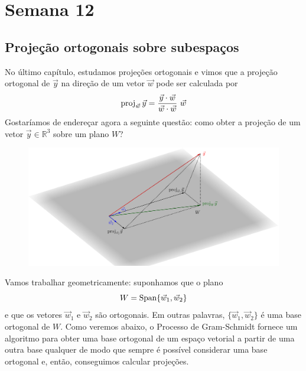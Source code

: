 

\providecommand{\dir}{..}


%

	\chapter{Semana 12}

\section{Projeção ortogonais sobre subespaços}

No último capítulo, estudamos projeções ortogonais e vimos que a projeção ortogonal de $\vec{y}$ na direção de um vetor $\vec{w}$ pode ser calculada por
\begin{equation}
\proj_{\vec{w}} \vec{y} = \frac{\vec{y} \cdot \vec{w}}{\vec{w} \cdot \vec{w}} \ \vec{w}
\end{equation} Gostaríamos de endereçar agora a seguinte questão: como obter a projeção de um vetor $\vec{y} \in \mathbb{R}^3$ sobre um plano $W$?

\begin{figure}[h!]
\begin{center}
\includegraphics[width=0.9\linewidth]{Semana12/semana12-proj}
\end{center}
\end{figure}
\noindent Vamos trabalhar geometricamente: suponhamos que o plano
\begin{equation}
W = \operatorname{Span} \{\vec{w}_1, \vec{w}_2\}
\end{equation} e que os vetores $\vec{w}_1$ e $\vec{w}_2$ são ortogonais. Em outras palavras, $\{\vec{w}_1, \vec{w}_2\}$ é uma base ortogonal de $W$. Como veremos abaixo, o Processo de Gram-Schmidt fornece um algoritmo para obter uma base ortogonal de um espaço vetorial a partir de uma outra base qualquer de modo que sempre é possível considerar uma base ortogonal e, então, conseguimos calcular projeções.

